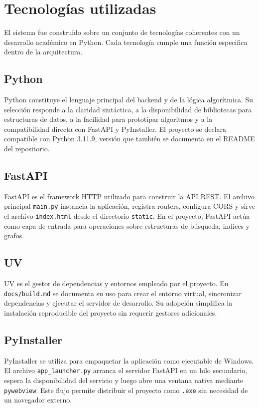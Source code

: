 \documentclass[12pt,onecolumn]{IEEEtran}
\begin{document}
\section{Tecnologías utilizadas}
El sistema fue construido sobre un conjunto de tecnologías coherentes con un desarrollo académico en Python. Cada tecnología cumple una función especifica dentro de la arquitectura.

\subsection{Python}
Python constituye el lenguaje principal del backend y de la lógica algorítmica. Su selección responde a la claridad sintáctica, a la disponibilidad de bibliotecas para estructuras de datos, a la facilidad para prototipar algoritmos y a la compatibilidad directa con FastAPI y PyInstaller. El proyecto se declara compatible con Python 3.11.9, versión que también se documenta en el README del repositorio.

\subsection{FastAPI}
FastAPI es el framework HTTP utilizado para construir la API REST. El archivo principal \texttt{main.py} instancia la aplicación, registra routers, configura CORS y sirve el archivo \texttt{index.html} desde el directorio \texttt{static}. En el proyecto, FastAPI actúa como capa de entrada para operaciones sobre estructuras de búsqueda, indices y grafos.

\subsection{UV}
UV es el gestor de dependencias y entornos empleado por el proyecto. En \texttt{docs/build.md} se documenta su uso para crear el entorno virtual, sincronizar dependencias y ejecutar el servidor de desarrollo. Su adopción simplifica la instalación reproducible del proyecto sin requerir gestores adicionales.

\subsection{PyInstaller}
PyInstaller se utiliza para empaquetar la aplicación como ejecutable de Windows. El archivo \texttt{app\_launcher.py} arranca el servidor FastAPI en un hilo secundario, espera la disponibilidad del servicio y luego abre una ventana nativa mediante \texttt{pywebview}. Este flujo permite distribuir el proyecto como \texttt{.exe} sin necesidad de un navegador externo.
\end{document}
